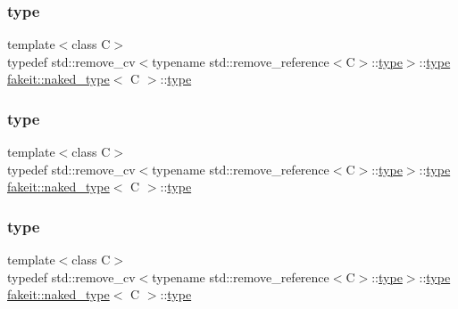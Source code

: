 \subsubsection{\texorpdfstring{type}{type}\hspace{0.1cm}{\footnotesize\ttfamily [4/9]}}
{\footnotesize\ttfamily template$<$class C$>$ \\
typedef std\+::remove\+\_\+cv$<$typename std\+::remove\+\_\+reference$<$C$>$\+::\mbox{\hyperlink{structfakeit_1_1naked__type_a3248a6c417c3a06d6e93576085fe7fcc}{type}}$>$\+::\mbox{\hyperlink{structfakeit_1_1naked__type_a3248a6c417c3a06d6e93576085fe7fcc}{type}} \mbox{\hyperlink{structfakeit_1_1naked__type}{fakeit\+::naked\+\_\+type}}$<$ C $>$\+::\mbox{\hyperlink{structfakeit_1_1naked__type_a3248a6c417c3a06d6e93576085fe7fcc}{type}}}

\mbox{\label{structfakeit_1_1naked__type_a3248a6c417c3a06d6e93576085fe7fcc}} 
\subsubsection{\texorpdfstring{type}{type}\hspace{0.1cm}{\footnotesize\ttfamily [5/9]}}
{\footnotesize\ttfamily template$<$class C$>$ \\
typedef std\+::remove\+\_\+cv$<$typename std\+::remove\+\_\+reference$<$C$>$\+::\mbox{\hyperlink{structfakeit_1_1naked__type_a3248a6c417c3a06d6e93576085fe7fcc}{type}}$>$\+::\mbox{\hyperlink{structfakeit_1_1naked__type_a3248a6c417c3a06d6e93576085fe7fcc}{type}} \mbox{\hyperlink{structfakeit_1_1naked__type}{fakeit\+::naked\+\_\+type}}$<$ C $>$\+::\mbox{\hyperlink{structfakeit_1_1naked__type_a3248a6c417c3a06d6e93576085fe7fcc}{type}}}

\mbox{\label{structfakeit_1_1naked__type_a3248a6c417c3a06d6e93576085fe7fcc}} 
\subsubsection{\texorpdfstring{type}{type}\hspace{0.1cm}{\footnotesize\ttfamily [6/9]}}
{\footnotesize\ttfamily template$<$class C$>$ \\
typedef std\+::remove\+\_\+cv$<$typename std\+::remove\+\_\+reference$<$C$>$\+::\mbox{\hyperlink{structfakeit_1_1naked__type_a3248a6c417c3a06d6e93576085fe7fcc}{type}}$>$\+::\mbox{\hyperlink{structfakeit_1_1naked__type_a3248a6c417c3a06d6e93576085fe7fcc}{type}} \mbox{\hyperlink{structfakeit_1_1naked__type}{fakeit\+::naked\+\_\+type}}$<$ C $>$\+::\mbox{\hyperlink{structfakeit_1_1naked__type_a3248a6c417c3a06d6e93576085fe7fcc}{type}}}

